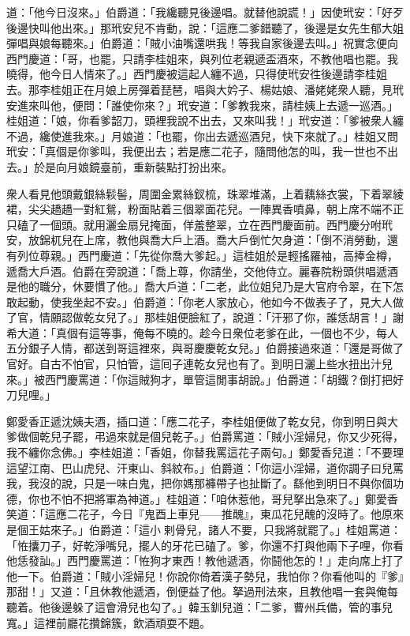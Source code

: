 道：「他今日沒來。」伯爵道：「我纔聽見後邊唱。就替他說謊！」因使玳安：「好歹後邊快叫他出來。」那玳安兒不肯動，說：「這應二爹錯聽了，後邊是女先生郁大姐彈唱與娘每聽來。」伯爵道：「賊小油嘴還哄我！等我自家後邊去叫。」祝實念便向西門慶道：「哥，也罷，只請李桂姐來，與列位老親遞盃酒來，不教他唱也罷。我曉得，他今日人情來了。」西門慶被這起人纏不過，只得使玳安徃後邊請李桂姐去。那李桂姐正在月娘上房彈着琵琶，唱與大妗子、楊姑娘、潘姥姥衆人聽，見玳安進來叫他，便問：「誰使你來？」玳安道：「爹教我來，請桂姨上去遞一巡酒。」桂姐道：「娘，你看爹韶刀，頭裡我說不出去，又來叫我！」玳安道：「爹被衆人纏不過，纔使進我來。」月娘道：「也罷，你出去遞巡酒兒，快下來就了。」桂姐又問玳安：「真個是你爹叫，我便出去；若是應二花子，隨問他怎的叫，我一世也不出去。」於是向月娘鏡臺前，重新裝點打扮出來。

衆人看見他頭戴銀絲鬏髻，周圍金累絲釵梳，珠翠堆滿，上着藕絲衣裳，下着翠綾裙，尖尖趫趫一對紅鴛，粉面貼着三個翠面花兒。一陣異香噴鼻，朝上席不端不正只磕了一個頭。就用灑金扇兒掩面，佯羞整翠，立在西門慶面前。西門慶分咐玳安，放錦杌兒在上席，教他與喬大戶上酒。喬大戶倒忙欠身道：「倒不消勞動，還有列位尊親。」西門慶道：「先從你喬大爹起。」這桂姐於是輕搖羅袖，高捧金樽，遞喬大戶酒。伯爵在旁說道：「喬上尊，你請坐，交他侍立。麗春院粉頭供唱遞酒是他的職分，休要慣了他。」喬大戶道：「二老，此位姐兒乃是大官府令翠，在下怎敢起動，使我坐起不安。」伯爵道：「你老人家放心，他如今不做表子了，見大人做了官，情願認做乾女兒了。」那桂姐便臉紅了，說道：「汗邪了你，誰恁胡言！」謝希大道：「真個有這等事，俺每不曉的。趁今日衆位老爹在此，一個也不少，每人五分銀子人情，都送到哥這裡來，與哥慶慶乾女兒。」{}伯爵接過來道：「還是哥做了官好。自古不怕官，只怕管，這囘子連乾女兒也有了。到明日灑上些水扭出汁兒來。」被西門慶罵道：「你這賊狗才，單管這閒事胡說。」伯爵道：「胡鐵？倒打把好刀兒哩。」

鄭愛香正遞沈姨夫酒，插口道：「應二花子，李桂姐便做了乾女兒，你到明日與大爹做個乾兒子罷，弔過來就是個兒乾子。」伯爵罵道：「賊小淫婦兒，你又少死得，我不纏你念佛。」李桂姐道：「香姐，你替我罵這花子兩句。」鄭愛香兒道：「不要理這望江南、巴山虎兒、汗東山、斜紋布。」{}伯爵道：「你這小淫婦，道你調子曰兒罵我，我沒的說，只是一味白鬼，把你媽那褲帶子也扯斷了。繇他到明日不與你個功德，你也不怕不把將軍為神道。」桂姐道：「咱休惹他，哥兒拏出急來了。」鄭愛香笑道：「這應二花子，今日『鬼酉上車兒——推醜』，東瓜花兒醜的沒時了。他原來是個王姑來子。」伯爵道：「這小𢱉剌骨兒，諸人不要，只我將就罷了。」桂姐罵道：「恠攮刀子，好乾淨嘴兒，擺人的牙花已磕了。爹，你還不打與他兩下子哩，你看他恁發訕。」西門慶罵道：「恠狗才東西！教他遞酒，你鬪他怎的！」走向席上打了他一下。伯爵道：「賊小淫婦兒！你說你倚着漢子勢兒，我怕你？你看他叫的『爹』那甜！」又道：「且休教他遞酒，倒便益了他。拏過刑法來，且教他唱一套與俺每聽着。他後邊躲了這會滑兒也勾了。」韓玉釧兒道：「二爹，曹州兵備，管的事兒寬。」這裡前廳花攢錦簇，飲酒頑耍不題。

